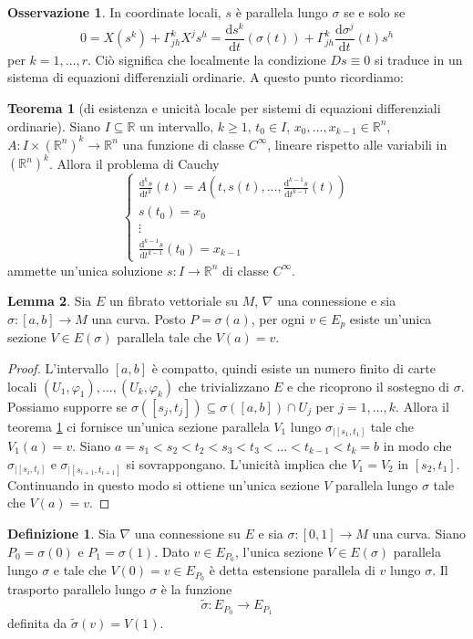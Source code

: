\documentclass[a4paper,11pt]{article}
\theoremstyle{definition}
\newtheorem{osservazione}{Osservazione}[section]
\newtheorem{definizione}{Definizione}[section]
\theoremstyle{theorem}
\newtheorem{teorema}{Teorema}[section]
\newtheorem{lemma}[teorema]{Lemma}
\newcommand{\dif}{\mathrm{d}}
\newcommand{\R}{\mathbb{R}}
\begin{document}
\begin{osservazione}
	In coordinate locali, $s$ è parallela lungo $\sigma$ se e solo se
	\[0=X(s^k)+\Gamma^k_{jh}X^js^h=\frac{\dif s^k}{\dif t}\left(\sigma(t)\right)+\Gamma^k_{jh}\frac{\dif \sigma^j}{\dif t}(t)s^h\]
	per $k=1,\dots,r$. Ciò significa che localmente la condizione $Ds\equiv0$ si traduce in un sistema di equazioni differenziali ordinarie. A questo punto ricordiamo:
\end{osservazione}
\begin{teorema}[di esistenza e unicità locale per sistemi di equazioni differenziali ordinarie]
	\label{sistemi}
	Siano $I\subseteq\R$ un intervallo, $k\geq1$, $t_0\in I$, $x_0,\dots,x_{k-1}\in\R^n$, $A\colon I\times\left(\R^n\right)^k\to\R^n$ una funzione di classe $C^\infty$, lineare rispetto alle variabili in $\left(\R^n\right)^k$. Allora il problema di Cauchy
	\[\left\{\begin{array}{l}
		\frac{\dif^k s}{\dif t^k}(t)=A\left(t,s(t),\dots,\frac{\dif^{k-1}s}{\dif t^{k-1}}(t)\right)\\
		s(t_0)=x_0\\
		\vdots\\
		\frac{\dif^{k-1}s}{\dif t^{k-1}}(t_0)=x_{k-1}
	\end{array}\right.\]
	ammette un'unica soluzione $s\colon I\to\R^n$ di classe $C^\infty$.
\end{teorema}
\begin{lemma}
	Sia $E$ un fibrato vettoriale su $M$, $\nabla$ una connessione e sia $\sigma\colon[a,b]\to M$ una curva. Posto $P=\sigma(a)$, per ogni $v\in E_p$ esiste un'unica sezione $V\in E(\sigma)$ parallela tale che $V(a)=v$.
\end{lemma}
\begin{proof}
	L'intervallo $[a,b]$ è compatto, quindi esiste un numero finito di carte locali $(U_1,\varphi_1),\dots,(U_k,\varphi_k)$ che trivializzano $E$ e che ricoprono il sostegno di $\sigma$. Possiamo supporre se $\sigma([s_j,t_j])\subseteq\sigma([a,b])\cap U_j$ per $j=1,\dots,k$. Allora il teorema \ref{sistemi} ci fornisce un'unica sezione parallela $V_1$ lungo $\sigma_{|[s_1,t_1]}$ tale che $V_1(a)=v$. Siano $a=s_1<s_2<t_2<s_3<t_3<\dots<t_{k-1}<t_k=b$ in modo che $\sigma_{|[s_i,t_{i}]}$ e $\sigma_{|[s_{i+1},t_{i+1}]}$ si sovrappongano. L'unicità implica che $V_1=V_2$ in $[s_2,t_1]$. Continuando in questo modo si ottiene un'unica sezione $V$ parallela lungo $\sigma$ tale che $V(a)=v$.
\end{proof}
\begin{definizione}
	Sia $\nabla$ una connessione su $E$ e sia $\sigma\colon[0,1]\to M$ una curva. Siano $P_0=\sigma(0)$ e $P_1=\sigma(1)$. Dato $v\in E_{P_0}$, l'unica sezione $V\in E(\sigma)$ parallela lungo $\sigma$ e tale che $V(0)=v\in E_{P_0}$ è detta estensione parallela di $v$ lungo $\sigma$. Il trasporto parallelo lungo $\sigma$ è la funzione
	\[\tilde{\sigma}\colon E_{P_0}\to E_{P_1}\]
	definita da $\tilde{\sigma}(v)=V(1)$.
\end{definizione}
\end{document}
